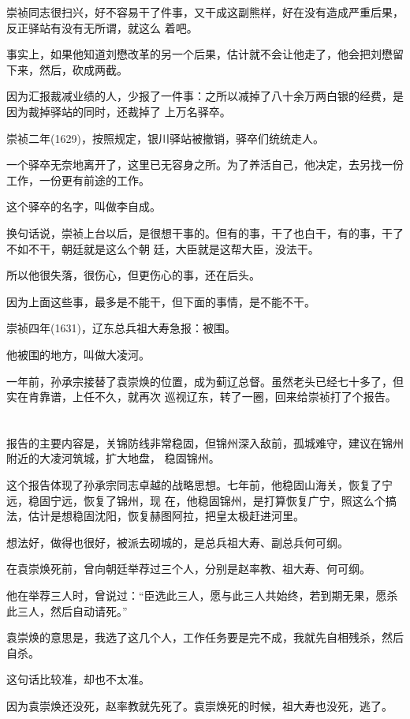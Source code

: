 \documentclass[11pt,a4paper,onecolumn]{article}
\begin{document}
崇祯同志很扫兴，好不容易干了件事，又干成这副熊样，好在没有造成严重后果，反正驿站有没有无所谓，就这么
着吧。

事实上，如果他知道刘懋改革的另一个后果，估计就不会让他走了，他会把刘懋留下来，然后，砍成两截。

因为汇报裁减业绩的人，少报了一件事：之所以减掉了八十余万两白银的经费，是因为裁掉驿站的同时，还裁掉了
上万名驿卒。

崇祯二年(1629)，按照规定，银川驿站被撤销，驿卒们统统走人。

一个驿卒无奈地离开了，这里已无容身之所。为了养活自己，他决定，去另找一份工作，一份更有前途的工作。

这个驿卒的名字，叫做李自成。

换句话说，崇祯上台以后，是很想干事的。但有的事，干了也白干，有的事，干了不如不干，朝廷就是这么个朝
廷，大臣就是这帮大臣，没法干。

所以他很失落，很伤心，但更伤心的事，还在后头。

因为上面这些事，最多是不能干，但下面的事情，是不能不干。

崇祯四年(1631)，辽东总兵祖大寿急报：被围。

他被围的地方，叫做大凌河。

一年前，孙承宗接替了袁崇焕的位置，成为蓟辽总督。虽然老头已经七十多了，但实在肯靠谱，上任不久，就再次
巡视辽东，转了一圈，回来给崇祯打了个报告。

\section[\thesection]{}

报告的主要内容是，关锦防线非常稳固，但锦州深入敌前，孤城难守，建议在锦州附近的大凌河筑城，扩大地盘，
稳固锦州。

这个报告体现了孙承宗同志卓越的战略思想。七年前，他稳固山海关，恢复了宁远，稳固宁远，恢复了锦州，现
在，他稳固锦州，是打算恢复广宁，照这么个搞法，估计是想稳固沈阳，恢复赫图阿拉，把皇太极赶进河里。

想法好，做得也很好，被派去砌城的，是总兵祖大寿、副总兵何可纲。

在袁崇焕死前，曾向朝廷举荐过三个人，分别是赵率教、祖大寿、何可纲。

他在举荐三人时，曾说过：``臣选此三人，愿与此三人共始终，若到期无果，愿杀此三人，然后自动请死。''

袁崇焕的意思是，我选了这几个人，工作任务要是完不成，我就先自相残杀，然后自杀。

这句话比较准，却也不太准。

因为袁崇焕还没死，赵率教就先死了。袁崇焕死的时候，祖大寿也没死，逃了。
\end{document}
